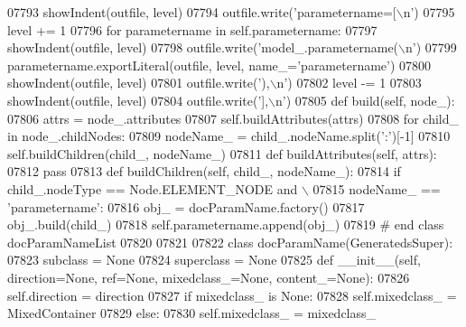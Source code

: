 \begin{DoxyCode}
{{{{{{{{{{{{{{{{{{{{{{{{{{{{{{{{{{{{{{{{{{{{{{{{{{{{{{{{{{{{{{{{{{{{{{{{{{{{{{{{{{{{{{{{{{{{{{{{{{{{{{{{{{{{{{{{{{{{{{{{{{{{{{{{{{{{{{{{{{{{{{{{{{{{{{{{{{{{{{{{{{{{{{{{{{{{{{{{{{{{{{{{{{{{{{{{{{{{{{{{{{{{{{{{{{{{{{{{{{{{{{{{{{{{{{{{{{{{{{{{{{{{{{{{{{{{{{{{{{{{{{{{{{{{{{{{{{{{{{{{{{{{{{{{{{{{{{{{{{{{{{{{{{{{{{{{{{{{{{{{{{{{{{{{{{{{{{{{{{{{{{{{{{{{{{{{{{{{{{{{{{{{{{{{{{{{{{{{{{{{{{{{{{{{{{{{{{{{{{{{{{{{{{{{{{{{{{{{{{{{{{{{{{{{{{{{{{{{{{{{{{{{{{{{{{{{{{{{{{{{{{{{{{{{{{{{{{{{{{{{{{07793         showIndent(outfile, level)
07794         outfile.write(\textcolor{stringliteral}{'parametername=[\(\backslash\)n'})
07795         level += 1
07796         \textcolor{keywordflow}{for} parametername \textcolor{keywordflow}{in} self.parametername:
07797             showIndent(outfile, level)
07798             outfile.write(\textcolor{stringliteral}{'model\_.parametername(\(\backslash\)n'})
07799             parametername.exportLiteral(outfile, level, name\_=\textcolor{stringliteral}{'parametername'})
07800             showIndent(outfile, level)
07801             outfile.write(\textcolor{stringliteral}{'),\(\backslash\)n'})
07802         level -= 1
07803         showIndent(outfile, level)
07804         outfile.write(\textcolor{stringliteral}{'],\(\backslash\)n'})
07805     \textcolor{keyword}{def }build(self, node\_):
07806         attrs = node\_.attributes
07807         self.buildAttributes(attrs)
07808         \textcolor{keywordflow}{for} child\_ \textcolor{keywordflow}{in} node\_.childNodes:
07809             nodeName\_ = child\_.nodeName.split(\textcolor{stringliteral}{':'})[-1]
07810             self.buildChildren(child\_, nodeName\_)
07811     \textcolor{keyword}{def }buildAttributes(self, attrs):
07812         \textcolor{keywordflow}{pass}
07813     \textcolor{keyword}{def }buildChildren(self, child\_, nodeName\_):
07814         \textcolor{keywordflow}{if} child\_.nodeType == Node.ELEMENT\_NODE \textcolor{keywordflow}{and} \(\backslash\)
07815             nodeName\_ == \textcolor{stringliteral}{'parametername'}:
07816             obj\_ = docParamName.factory()
07817             obj\_.build(child\_)
07818             self.parametername.append(obj\_)
07819 \textcolor{comment}{# end class docParamNameList}
07820 
07821 
07822 \textcolor{keyword}{class }docParamName(GeneratedsSuper):
07823     subclass = \textcolor{keywordtype}{None}
07824     superclass = \textcolor{keywordtype}{None}
07825     \textcolor{keyword}{def }__init__(self, direction=None, ref=None, mixedclass\_=None, content\_=None):
07826         self.direction = direction
07827         \textcolor{keywordflow}{if} mixedclass\_ \textcolor{keywordflow}{is} \textcolor{keywordtype}{None}:
07828             self.mixedclass_ = MixedContainer
07829         \textcolor{keywordflow}{else}:
07830             self.mixedclass_ = mixedclass\_
}}}}}}}}}}}}}}}}}}}}}}}}}}}}}}}}}}}}}}}}}}}}}}}}}}}}}}}}}}}}}}}}}}}}}}}}}}}}}}}}}}}}}}}}}}}}}}}}}}}}}}}}}}}}}}}}}}}}}}}}}}}}}}}}}}}}}}}}}}}}}}}}}}}}}}}}}}}}}}}}}}}}}}}}}}}}}}}}}}}}}}}}}}}}}}}}}}}}}}}}}}}}}}}}}}}}}}}}}}}}}}}}}}}}}}}}}}}}}}}}}}}}}}}}}}}}}}}}}}}}}}}}}}}}}}}}}}}}}}}}}}}}}}}}}}}}}}}}}}}}}}}}}}}}}}}}}}}}}}}}}}}}}}}}}}}}}}}}}}}}}}}}}}}}}}}}}}}}}}}}}}}}}}}}}}}}}}}}}}}}}}}}}}}}}}}}}}}}}}}}}}}}}}}}}}}}}}}}}}}}}}}}}}}}}}}}}}}}}}}}}}}}}}}}}}}}}}}}}}}}}}}}}}}}}}}}}}}}}}}}}}
\end{DoxyCode}
